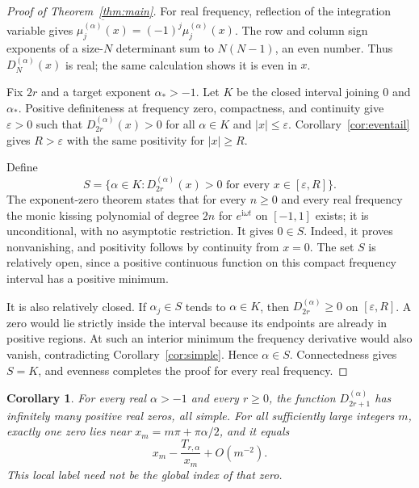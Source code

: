 \documentclass[11pt]{article}
\numberwithin{equation}{section}
\newtheorem{corollary}[theorem]{Corollary}
\theoremstyle{remark}
\newcommand{\ii}{\mathrm{i}}
\begin{document}
\begin{proof}[Proof of Theorem~\ref{thm:main}]
For real frequency, reflection of the integration variable gives
$\overline{\mu_j^{(\alpha)}(x)}=(-1)^j\mu_j^{(\alpha)}(x)$.
The row and column sign exponents of a size-$N$ determinant sum to
$N(N-1)$, an even number. Thus $D_N^{(\alpha)}(x)$ is real; the same
calculation shows it is even in $x$.

Fix $2r$ and a target exponent $\alpha_*>-1$. Let $K$ be the closed
interval joining $0$ and $\alpha_*$. Positive definiteness at frequency
zero, compactness, and continuity give $\varepsilon>0$ such that
$D_{2r}^{(\alpha)}(x)>0$ for all $\alpha\in K$ and $|x|\le\varepsilon$.
Corollary~\ref{cor:eventail} gives $R>\varepsilon$ with the same
positivity for $|x|\ge R$.

Define
\[
 S=\{\alpha\in K:D_{2r}^{(\alpha)}(x)>0
                       \text{ for every }x\in[\varepsilon,R]\}.
\]
The exponent-zero theorem \cite[Theorem~4.3]{Celsus2022} states that
for every $n\ge0$ and every real frequency the monic kissing polynomial
of degree $2n$ for $e^{\ii\omega t}$ on $[-1,1]$ exists; it is
unconditional, with no asymptotic restriction. It gives
$0\in S$. Indeed, it proves nonvanishing, and positivity follows by
continuity from $x=0$. The set $S$ is relatively open, since a positive
continuous function on this compact frequency interval has a positive
minimum.

It is also relatively closed. If $\alpha_j\in S$ tends to $\alpha\in K$,
then $D_{2r}^{(\alpha)}\ge0$ on $[\varepsilon,R]$. A zero would lie
strictly inside the interval because its endpoints are already in
positive regions. At such an interior minimum the frequency derivative
would also vanish, contradicting Corollary~\ref{cor:simple}. Hence
$\alpha\in S$. Connectedness gives $S=K$, and evenness completes the
proof for every real frequency.
\end{proof}

\begin{corollary}\label{cor:oddzeros}
For every real $\alpha>-1$ and every $r\ge0$, the function
$D_{2r+1}^{(\alpha)}$ has infinitely many positive real zeros, all simple.
For all sufficiently large integers $m$, exactly one zero lies near
$x_m=m\pi+\pi\alpha/2$, and it equals
\begin{equation}\label{eq:oddzerolocation}
                      x_m-\frac{T_{r,\alpha}}{x_m}+O(m^{-2}).
\end{equation}
This local label need not be the global index of that zero.
\end{corollary}
\end{document}
